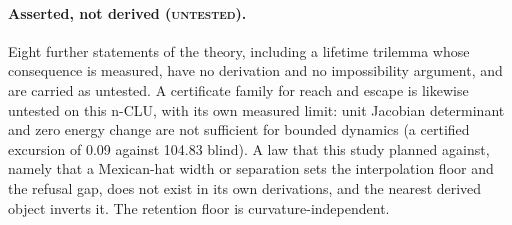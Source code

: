 \documentclass{article} %
\begin{document}
\paragraph{Asserted, not derived (\textsc{untested}).} Eight further statements of the theory,
including a lifetime trilemma whose consequence is measured, have no derivation and no
impossibility argument, and are carried as untested. A certificate family for reach and escape is
likewise untested on this n-CLU, with its own measured limit: unit Jacobian determinant and zero
energy change are not sufficient for bounded dynamics (a certified excursion of 0.09 against
104.83 blind). %
A law that this study planned against, namely that a Mexican-hat width or separation sets
the interpolation floor and the refusal gap, does not exist in its own derivations, and the
nearest derived object inverts it. The retention floor is curvature-independent. %
\end{document}
